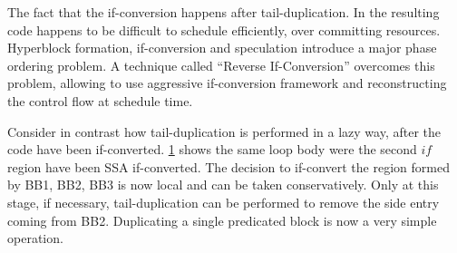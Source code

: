 \begin{figure}[h]
{    \label{fig:hyper4}}
\end{figure}

The fact that the if-conversion happens after tail-duplication. In the resulting code happens to be difficult to schedule efficiently, over committing resources. Hyperblock formation, if-conversion and speculation introduce a major phase ordering problem. A technique called ``Reverse If-Conversion'' \cite{August:1999:PRI:326224.325595} overcomes this problem, allowing to use aggressive if-conversion framework and reconstructing the control flow at schedule time.

Consider in contrast how tail-duplication is performed in a lazy way, after the code have been if-converted. \ref{fig:hyper4} shows the same loop body were the second $if$ region have been SSA if-converted. The decision to if-convert the region formed by {BB1, BB2, BB3} is now local and can be taken conservatively. Only at this stage, if necessary, tail-duplication can be performed to remove the side entry coming from BB2. Duplicating a single predicated block is now a very simple operation.

